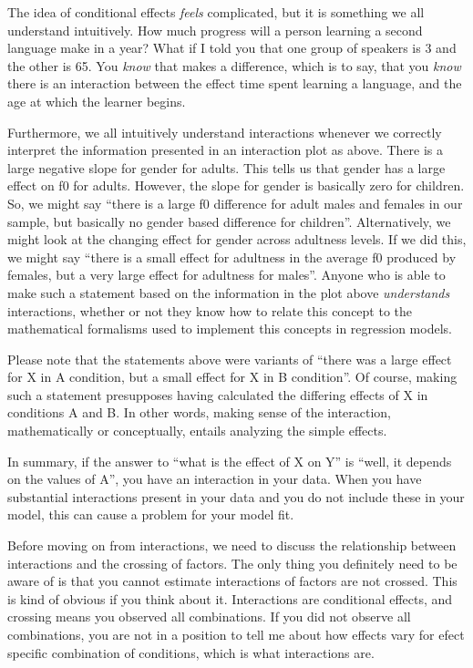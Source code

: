 \documentclass[
]{book}
\begin{document}
The idea of conditional effects \emph{feels} complicated, but it is something we all understand intuitively. How much progress will a person learning a second language make in a year? What if I told you that one group of speakers is 3 and the other is 65. You \emph{know} that makes a difference, which is to say, that you \emph{know} there is an interaction between the effect time spent learning a language, and the age at which the learner begins.

Furthermore, we all intuitively understand interactions whenever we correctly interpret the information presented in an interaction plot as above. There is a large negative slope for gender for adults. This tells us that gender has a large effect on f0 for adults. However, the slope for gender is basically zero for children. So, we might say ``there is a large f0 difference for adult males and females in our sample, but basically no gender based difference for children''. Alternatively, we might look at the changing effect for gender across adultness levels. If we did this, we might say ``there is a small effect for adultness in the average f0 produced by females, but a very large effect for adultness for males''. Anyone who is able to make such a statement based on the information in the plot above \emph{understands} interactions, whether or not they know how to relate this concept to the mathematical formalisms used to implement this concepts in regression models.

Please note that the statements above were variants of ``there was a large effect for X in A condition, but a small effect for X in B condition''. Of course, making such a statement presupposes having calculated the differing effects of X in conditions A and B. In other words, making sense of the interaction, mathematically or conceptually, entails analyzing the simple effects.

In summary, if the answer to ``what is the effect of X on Y'' is ``well, it depends on the values of A'', you have an interaction in your data. When you have substantial interactions present in your data and you do not include these in your model, this can cause a problem for your model fit.

Before moving on from interactions, we need to discuss the relationship between interactions and the crossing of factors. The only thing you definitely need to be aware of is that you cannot estimate interactions of factors are not crossed. This is kind of obvious if you think about it. Interactions are conditional effects, and crossing means you observed all combinations. If you did not observe all combinations, you are not in a position to tell me about how effects vary for efect specific combination of conditions, which is what interactions are.
\end{document}
